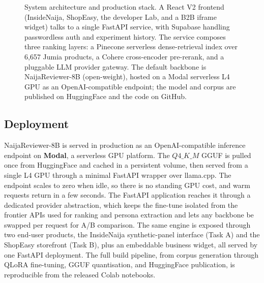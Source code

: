 \documentclass[sigconf,nonacm,balance]{acmart}
\begin{document}
\begin{figure}[!t]
\caption{System architecture and production stack. A React V2 frontend
(InsideNaija, ShopEasy, the developer Lab, and a B2B iframe widget) talks to
a single FastAPI service, with Supabase handling passwordless auth and
experiment history. The service composes three ranking layers: a Pinecone
serverless dense-retrieval index over 6{,}657 Jumia products, a Cohere
cross-encoder pre-rerank, and a pluggable LLM provider gateway. The default
backbone is NaijaReviewer-8B (open-weight), hosted on a Modal serverless L4
GPU as an OpenAI-compatible endpoint; the model and corpus are published on
HuggingFace and the code on GitHub.}
\label{fig:sysarch-a}
\end{figure}

\subsection{Deployment}
\label{sec:deploy}
NaijaReviewer-8B is served in production as an OpenAI-compatible inference
endpoint on \textbf{Modal}, a serverless GPU platform. The $Q4\_K\_M$ GGUF is
pulled once from HuggingFace and cached in a persistent volume, then served
from a single L4 GPU through a minimal FastAPI wrapper over
\textsf{llama.cpp}. The endpoint scales to zero when idle, so there is no
standing GPU cost, and warm requests return in a few seconds. The FastAPI
application reaches it through a dedicated provider abstraction, which keeps
the fine-tune isolated from the frontier APIs used for ranking and persona
extraction and lets any backbone be swapped per request for A/B comparison.
The same engine is exposed through two end-user products, the InsideNaija
synthetic-panel interface (Task A) and the ShopEasy storefront (Task B), plus
an embeddable business widget, all served by one FastAPI deployment. The full
build pipeline, from corpus generation through QLoRA fine-tuning, GGUF
quantisation, and HuggingFace publication, is reproducible from the released
Colab notebooks.
\end{document}
